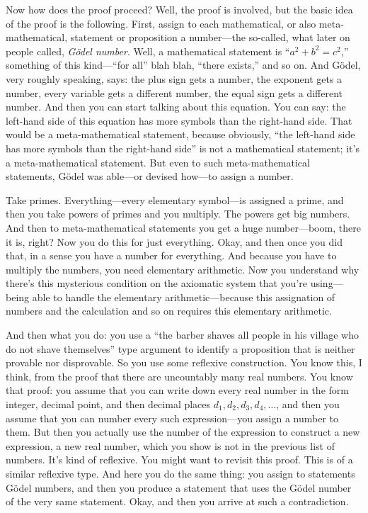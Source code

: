Now how does the proof proceed? Well, the proof is involved, but the basic idea of the proof is the following. First, assign to each mathematical, or also meta-mathematical, statement or proposition a number---the so-called, what later on people called, \emph{G\"odel number}. Well, a mathematical statement is ``$a^2 + b^2 = c^2$,'' something of this kind---``for all'' blah blah, ``there exists,'' and so on. And G\"odel, very roughly speaking, says: the plus sign gets a number, the exponent gets a number, every variable gets a different number, the equal sign gets a different number. And then you can start talking about this equation. You can say: the left-hand side of this equation has more symbols than the right-hand side. That would be a meta-mathematical statement, because obviously, ``the left-hand side has more symbols than the right-hand side'' is not a mathematical statement; it's a meta-mathematical statement. But even to such meta-mathematical statements, G\"odel was able---or devised how---to assign a number.

Take primes. Everything---every elementary symbol---is assigned a prime, and then you take powers of primes and you multiply. The powers get big numbers. And then to meta-mathematical statements you get a huge number---boom, there it is, right? Now you do this for just everything. Okay, and then once you did that, in a sense you have a number for everything. And because you have to multiply the numbers, you need elementary arithmetic. Now you understand why there's this mysterious condition on the axiomatic system that you're using---being able to handle the elementary arithmetic---because this assignation of numbers and the calculation and so on requires this elementary arithmetic.

And then what you do: you use a ``the barber shaves all people in his village who do not shave themselves'' type argument to identify a proposition that is neither provable nor disprovable. So you use some reflexive construction. You know this, I think, from the proof that there are uncountably many real numbers. You know that proof: you assume that you can write down every real number in the form integer, decimal point, and then decimal places $d_1, d_2, d_3, d_4, \ldots$, and then you assume that you can number every such expression---you assign a number to them. But then you actually use the number of the expression to construct a new expression, a new real number, which you show is not in the previous list of numbers. It's kind of reflexive. You might want to revisit this proof. This is of a similar reflexive type. And here you do the same thing: you assign to statements G\"odel numbers, and then you produce a statement that uses the G\"odel number of the very same statement. Okay, and then you arrive at such a contradiction.

